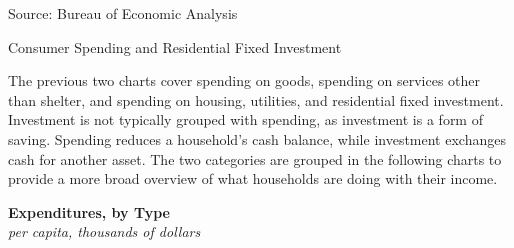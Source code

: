 \documentclass{report}
\makeatletter
\newcommand{\tbllink}[1]{\href{https://raw.githubusercontent.com/bdecon/US-chartbook/master/chartbook/data/#1}{\faTable}}
\newcommand*\short[1]{\expandafter\@gobbletwo\number\numexpr#1\relax}
\newcommand{\absnode}[3]{\node[below right, align=left] at (axis cs: #1,#2) {#3};}
\newcommand{\shdateaxisticks}{
		date coordinates in=x, axis line style={draw=none},
		xmax={2024-01-31},
		max space between ticks=40,	    
		xtick={{1990-01-01}, {1995-01-01}, {2000-01-01}, 
			{2005-01-01}, {2010-01-01}, {2015-01-01}, {2020-01-01}},
		minor xtick={},
		enlarge y limits={0.06}, enlarge x limits={0.01},
		xticklabel style={align=center, yshift=-2pt}, tick label style={inner sep=0pt},
		}
\newcommand{\bbar}[2]{extra #1 ticks = {{#2}}, extra #1 tick labels = ,
		extra #1 tick style = {grid=major, grid style={thick, black!25}},}
\newcommand{\stdline}[4]{\addplot[very thick, no markers, color=#1] 
		table [x=#2, y=#3, col sep=comma] {#4};	}
\newcommand{\rbars}{
		\fill[color=black!10] (axis cs:{1990-07-01},\pgfkeysvalueof{/pgfplots/ymin})
			rectangle (axis cs:{1991-03-01}, \pgfkeysvalueof{/pgfplots/ymax});
		\fill[color=black!10] (axis cs:{2007-12-01},\pgfkeysvalueof{/pgfplots/ymin})
			rectangle (axis cs:{2009-07-01}, \pgfkeysvalueof{/pgfplots/ymax});
		\fill[color=black!10] (axis cs:{2001-03-01},\pgfkeysvalueof{/pgfplots/ymin})
			rectangle (axis cs:{2001-11-01}, \pgfkeysvalueof{/pgfplots/ymax});
		\fill[color=black!10] (axis cs:{2020-02-01},\pgfkeysvalueof{/pgfplots/ymin})
			rectangle (axis cs:{2020-05-01}, \pgfkeysvalueof{/pgfplots/ymax});}
\makeatother
\begin{document}
{\begin{minipage}{0.38\textwidth}
\hspace{3mm} 

\footnotesize{Source: Bureau of Economic Analysis} \hspace{10mm} \tbllink{pce_levels.csv}
\end{minipage} \hspace{6mm}
\begin{minipage}{0.33\textwidth}
\small 
\end{minipage}
\newpage 
\begin{minipage}{1.0\textwidth}    
\normalsize Consumer Spending and Residential Fixed Investment
\vspace{-0.5mm}

\small The previous two charts cover spending on goods, spending on services other than shelter, and spending on housing, utilities, and residential fixed investment. Investment is not typically grouped with spending, as investment is a form of saving. Spending reduces a household's cash balance, while investment exchanges cash for another asset. The two categories are grouped in the following charts to provide a more broad overview of what households are doing with their income. 
\end{minipage}
\vspace{1mm}

\begin{minipage}{0.38\textwidth}
\normalsize \textbf{Expenditures, by Type}\\
\footnotesize{\textit{per capita, thousands of dollars}}
\vspace{4.4cm}


\end{minipage}}
\end{document}
